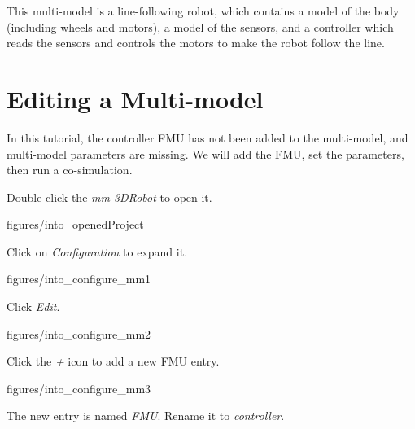 \documentclass[11pt,a4paper]{../tutorial}
\begin{document}
This multi-model is a line-following robot, which contains a model of the body (including wheels and motors), a model of the sensors, and a controller which reads the sensors and controls the motors to make the robot follow the line.

\section{Editing a Multi-model}

In this tutorial, the controller FMU has not been added to the multi-model, and multi-model parameters are missing. We will add the FMU, set the parameters, then run a co-simulation.

\begin{instructions}
\item Double-click the \emph{mm-3DRobot} to open it.

    \begin{annotation}[width=0.53\linewidth,trim=0 0 250 200,clip]{figures/into_openedProject}
    \end{annotation}

\newpage
\item Click on \emph{Configuration} to expand it.

    \begin{annotation}[width=0.8\linewidth]{figures/into_configure_mm1}
    \end{annotation}

\item Click \emph{Edit}.

    \begin{annotation}[width=0.8\linewidth,trim=0 0 0 250,clip]{figures/into_configure_mm2}
    \end{annotation}

\item Click the \emph{+} icon to add a new FMU entry.

    \begin{annotation}[width=0.8\linewidth,trim=0 120 0 250,clip]{figures/into_configure_mm3}
    \end{annotation}

\item The new entry is named \emph{FMU}. Rename it to \emph{controller}.


\end{instructions}
\end{document}
